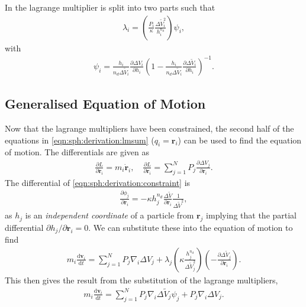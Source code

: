 In \citet{hopkins2013} the lagrange multiplier is split into two parts such that
\begin{align}
    \lambda_i =
    \left(\frac{P_i}{\kappa}
      \frac{\Delta \tilde{V}^2_i}{h^{n_d}_i}
    \right)\psi_i,
   \label{eqn:sph:derivation:lambda_i}
\end{align}
with
\begin{align}
  \psi_i =
    \frac{h_i}{n_d \Delta \tilde{V}_i}
    \frac{\partial \Delta V_i}{\partial h_i}
    \left(1 - \frac{h_i}{n_d \Delta \tilde{V}_i}
      \frac{\partial \Delta \tilde{V}_i}{\partial h_i}
    \right)^{-1}.
  \label{eqn:sph:derivation:psi_I}
\end{align}

\subsection{Generalised Equation of Motion}

Now that the lagrange multipliers have been constrained, the second half of the
equations in \ref{eqn:sph:derivation:lmsum} ($q_i = \mathbf{r}_i$) can be used
to find the equation of motion. The differentials are given as
\begin{align}
    \frac{\partial L}{\partial \dot{\mathbf{r}}_i} = m_i \dot{\mathbf{r}}_i,
    \quad
    \frac{\partial L}{\partial \mathbf{r}_i} =
      \sum_{j=1}^N P_j \frac{\partial \Delta V_j}{\partial \mathbf{r}_i}.
\end{align}
The differential of \ref{eqn:sph:derivation:constraint} is
\begin{align}
    \frac{\partial \phi_j}{\partial \mathbf{r}_i} =
      - \kappa h_j^{n_d} \frac{\Delta \tilde{V}}{\partial \mathbf{r}_i}
        \frac{1}{\Delta \tilde{V}^2},
\end{align}
as $h_j$ is an \emph{independent coordinate} of a particle from $\mathbf{r}_j$
implying that the partial differential $\partial h_j/\partial \mathbf{r}_i = 0$.
We can substitute these into the equation of motion to find
\begin{align}
  m_i \frac{\mathrm{d} \mathbf{v}_i}{\mathrm{d}t} =  
    \sum^N_{j=1}  P_j \nabla_i \Delta V_j + \lambda_j
      \left(
        \kappa \frac{h_j^{n_d}}{\Delta \tilde{V}_j^2}
      \right)
      \left(
        - \frac{\partial \Delta \tilde{V}_j}{\partial \mathbf{r}_i}
      \right).
\end{align}
This then gives the result from the substitution of the lagrange multipliers, 
\begin{align}
  m_i \frac{\mathrm{d} \mathbf{v}_i}{\mathrm{d}t} =
  \sum^N_{j=1} P_j \nabla_i \Delta \tilde{V}_j \psi_j +
  P_j \nabla_i \Delta V_j.
  \label{eqn:sph:derivation:eom}
\end{align}

